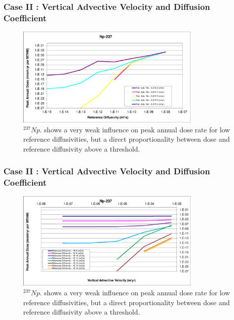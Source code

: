 \begin{frame}[c]
  \frametitle{Case II : Vertical Advective Velocity and Diffusion Coefficient}
\begin{figure}[htp!]
\centering
\includegraphics[width=0.8\textwidth]{AdvVelAndDiffCoeffEBSFail/Np-237.eps}
\caption{$^{237}Np$.
shows a very weak influence on peak annual dose 
rate for low reference diffusivities, but a direct proportionality between 
dose and reference diffusivity above a threshold.}
\label{fig:VAdvVelNp237}
\end{figure}
\end{frame}

\begin{frame}[c]
  \frametitle{Case II : Vertical Advective Velocity and Diffusion Coefficient}
\begin{figure}[ht!]
\centering
\includegraphics[width=0.8\textwidth]{AdvVelAndDiffCoeffEBSFail/Np-237-VAdvVel.eps}
\caption{$^{237}Np$.
shows a very weak influence on peak annual dose 
rate for low reference diffusivities, but a direct proportionality between 
dose and reference diffusivity above a threshold.}
\label{fig:VAdvVelNp237VAdvVel}
\end{figure}
\end{frame}

